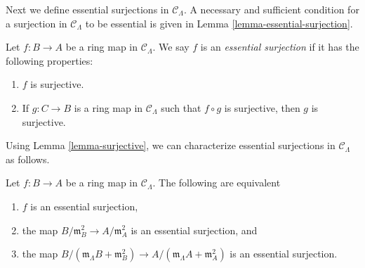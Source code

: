 \noindent
Next we define essential surjections in $\mathcal{C}_\Lambda$. A necessary
and sufficient condition for a surjection in $\mathcal{C}_\Lambda$ to be
essential is given in Lemma \ref{lemma-essential-surjection}.

\begin{definition}
\label{definition-essential-surjection}
Let $f: B \to A$ be a ring map in $\mathcal{C}_\Lambda$.  We say $f$
is an {\it essential surjection} if it has the following properties:
\begin{enumerate}
\item $f$ is surjective.
\item If $g: C \to B$ is a ring map in $\mathcal{C}_\Lambda$ such that
$f \circ g$ is surjective, then $g$ is surjective.
\end{enumerate}
\end{definition}

\noindent
Using Lemma \ref{lemma-surjective}, we can characterize
essential surjections in $\mathcal{C}_\Lambda$ as follows.

\begin{lemma}
\label{lemma-essential-surjection-mod-squares}
Let $f: B \to A$ be a ring map in $\mathcal{C}_\Lambda$.
The following are equivalent
\begin{enumerate}
\item $f$ is an essential surjection,
\item the map $B/\mathfrak m_B^2 \to A/\mathfrak m_A^2$ is an essential
surjection, and
\item the map
$B/(\mathfrak m_\Lambda B + \mathfrak m_B^2) \to
A/(\mathfrak m_\Lambda A + \mathfrak m_A^2)$ is an essential surjection.
\end{enumerate}
\end{lemma}

